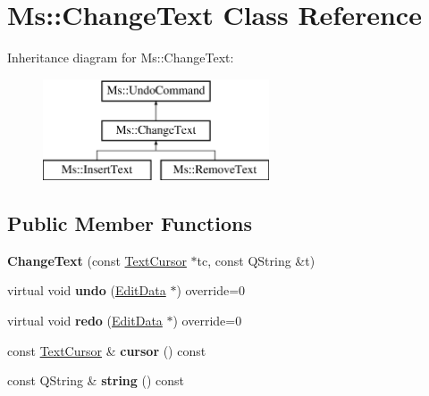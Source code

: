 \hypertarget{class_ms_1_1_change_text}{}\section{Ms\+:\+:Change\+Text Class Reference}
\label{class_ms_1_1_change_text}
Inheritance diagram for Ms\+:\+:Change\+Text\+:\begin{figure}[H]
\begin{center}
\leavevmode
\includegraphics[height=3.000000cm]{class_ms_1_1_change_text}
\end{center}
\end{figure}
\subsection*{Public Member Functions}
\begin{DoxyCompactItemize}
\item 
\mbox{\label{class_ms_1_1_change_text_aafe532fb706b559fa8091a7f91bea26a}} 
{\bfseries Change\+Text} (const \hyperlink{class_ms_1_1_text_cursor}{Text\+Cursor} $\ast$tc, const Q\+String \&t)
\item 
\mbox{\label{class_ms_1_1_change_text_a7110420dd389650591f741db904c7255}} 
virtual void {\bfseries undo} (\hyperlink{class_ms_1_1_edit_data}{Edit\+Data} $\ast$) override=0
\item 
\mbox{\label{class_ms_1_1_change_text_ab888d6b0c35f784c450d75e280b5f2e8}} 
virtual void {\bfseries redo} (\hyperlink{class_ms_1_1_edit_data}{Edit\+Data} $\ast$) override=0
\item 
\mbox{\label{class_ms_1_1_change_text_a23328d292b300661749537136af22f1f}} 
const \hyperlink{class_ms_1_1_text_cursor}{Text\+Cursor} \& {\bfseries cursor} () const
\item 
\mbox{\label{class_ms_1_1_change_text_a9bd89c436d1b95ec7b7fcfb7beb15ef7}} 
const Q\+String \& {\bfseries string} () const
\end{DoxyCompactItemize}

